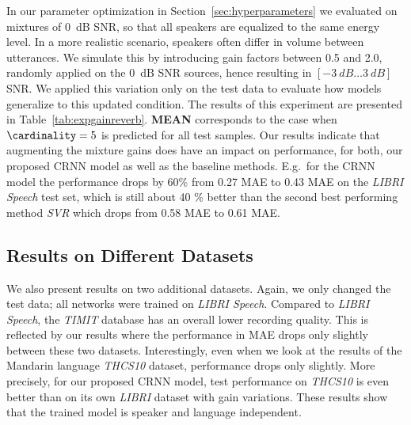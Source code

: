 In our parameter optimization in Section~\ref{sec:hyperparameters} we evaluated on mixtures of 0~dB SNR, so that all speakers are equalized to the same energy level.
In a more realistic scenario, speakers often differ in volume between utterances.
We simulate this by introducing gain factors between 0.5 and 2.0, randomly applied on the 0~dB SNR sources, hence resulting in $[-3~dB \ldots 3~dB]$ SNR.
We applied this variation only on the test data to evaluate how models generalize to this updated condition.
The results of this experiment are presented in Table~\ref{tab:expgainreverb}.
\textbf{MEAN} corresponds to the case when \(\cardinality = 5\) is predicted for all test samples.
Our results indicate that augmenting the mixture gains does have an impact on performance, for both, our proposed CRNN model as well as the baseline methods.
E.g.\ for the CRNN model the performance drops by 60\% from 0.27 MAE to 0.43 MAE on the \emph{LIBRI Speech} test set, which is still about 40 \% better than the second best performing method \emph{SVR} which drops from 0.58 MAE to 0.61 MAE.\@

\subsection{Results on Different Datasets}%
\label{ssec:r_datasets}
We also present results on two additional datasets.
Again, we only changed the test data; all networks were trained on \emph{LIBRI Speech}.
Compared to \emph{LIBRI Speech}, the \emph{TIMIT} database has an overall lower recording quality.
This is reflected by our results where the performance in MAE drops only slightly between these two datasets.
Interestingly, even when we look at the results of the Mandarin language \emph{THCS10} dataset, performance drops only slightly.
More precisely, for our proposed CRNN model, test performance on \emph{THCS10} is even better than on its own \emph{LIBRI} dataset with gain variations.
These results show that the trained model is speaker and language independent.



